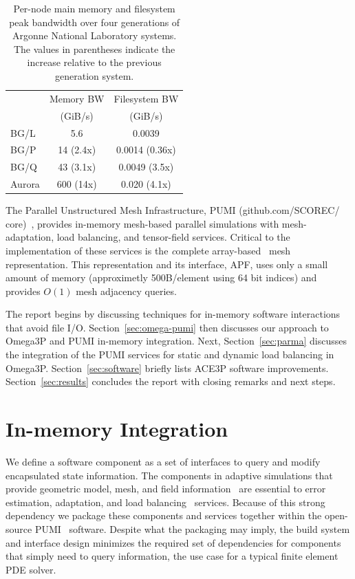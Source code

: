 \documentclass[a4paper]{article}
\begin{document}
\begin{table}[h]
\centering
\caption{Per-node main memory and filesystem peak bandwidth over four
  generations of Argonne National Laboratory systems.
  The values in parentheses indicate the increase relative to
  the previous generation system.}
\label{tbl:systems}
\begin{tabular}{l|cc}
        & Memory BW & Filesystem BW \\
        & (GiB/s)    & (GiB/s)    \\
 \hline
 BG/L   & 5.6       & 0.0039         \\
 BG/P   & 14 (2.4x) & 0.0014 (0.36x)   \\
 BG/Q   & 43 (3.1x) & 0.0049 (3.5x) \\
 Aurora & 600 (14x) & 0.020 (4.1x)
\end{tabular}
\end{table}

The Parallel Unstructured Mesh Infrastructure, PUMI
{\small (github.com/SCOREC/\\core)}~\cite{ibanez2015pumi},
provides in-memory mesh-based parallel simulations with mesh-adaptation, load
balancing, and tensor-field services.
Critical to the implementation of these services is the {\textit complete}
array-based~\cite{ibanezArray16} mesh representation.
This representation and its interface, APF, uses only a small amount of memory
(approximetly 500B/element using 64 bit indices) and provides $O(1)$ mesh
adjacency queries.

The report begins by discussing techniques for in-memory software interactions
that avoid file I/O.
Section~\ref{sec:omega-pumi} then discusses our approach to Omega3P and PUMI
in-memory integration.
Next, Section~\ref{sec:parma} discusses the integration of the PUMI services
for static and dynamic load balancing in Omega3P.
Section~\ref{sec:software} briefly lists ACE3P software improvements.
Section~\ref{sec:results} concludes the report with closing remarks and next
steps.

\section{In-memory Integration}\label{sec:inmem}

We define a software component as a set of interfaces to query and modify
encapsulated state information.
The components in adaptive simulations that provide geometric model, mesh, and
field information~\cite{BeaWal,ibanez2015pumi,Ollivier10} are essential to error
estimation, adaptation, and load balancing~\cite{SmithParma2015} services.
Because of this strong dependency we package these components and services
together within the open-source PUMI~\cite{ibanez2015pumi} software.
Despite what the packaging may imply, the build system and interface design
minimizes the required set of dependencies for components that simply need to
query information, the use case for a typical finite element PDE solver.
\end{document}
